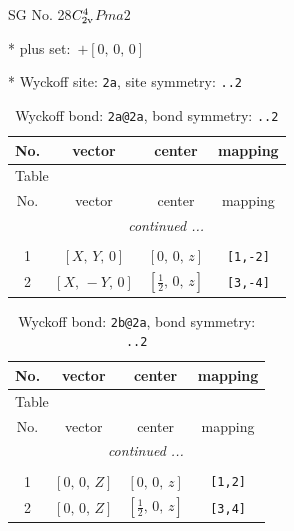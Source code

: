 \documentclass[fleqn,8pt]{jsarticle}
\begin{document}
\setcounter{MaxMatrixCols}{32}

\renewcommand{\tablename}{Table~}
\renewcommand{\figurename}{Figure~}
\begin{center}
\LARGE
SG No. 28\quad$C_{\rm 2v}^{4}$\quad$Pma2$\quad[ orthorhombic ]
\end{center}

* plus set:\,\,\,$+\left[ 0,\, 0,\, 0 \right]$


* Wyckoff site: {\tt 2a}, site symmetry: {\tt ..2}
\renewcommand{\arraystretch}{1.2}
\begin{longtable}{cccc}
\caption{Wyckoff bond: {\tt 2a@2a}, bond symmetry: {\tt ..2}}
 \\
 \hline \hline
No. & vector & center & mapping \\ \hline \endfirsthead

\multicolumn{3}{l}{\tablename\ \thetable{}} \\
 \hline \hline
No. & vector & center & mapping \\ \hline \endhead

 \hline \hline
\multicolumn{3}{r}{\footnotesize\it continued ...} \\ \endfoot

 \hline \hline
\multicolumn{3}{r}{} \\ \endlastfoot

1 & $\left[ X,\, Y,\, 0 \right]$ & $\left[ 0,\, 0,\, z \right]$ & {\tt [1,-2]} \\ \hline
2 & $\left[ X,\, - Y,\, 0 \right]$ & $\left[ \frac{1}{2},\, 0,\, z \right]$ & {\tt [3,-4]} \\
\end{longtable}
\renewcommand{\arraystretch}{1.2}
\begin{longtable}{cccc}
\caption{Wyckoff bond: {\tt 2b@2a}, bond symmetry: {\tt ..2}}
 \\
 \hline \hline
No. & vector & center & mapping \\ \hline \endfirsthead

\multicolumn{3}{l}{\tablename\ \thetable{}} \\
 \hline \hline
No. & vector & center & mapping \\ \hline \endhead

 \hline \hline
\multicolumn{3}{r}{\footnotesize\it continued ...} \\ \endfoot

 \hline \hline
\multicolumn{3}{r}{} \\ \endlastfoot

1 & $\left[ 0,\, 0,\, Z \right]$ & $\left[ 0,\, 0,\, z \right]$ & {\tt [1,2]} \\ \hline
2 & $\left[ 0,\, 0,\, Z \right]$ & $\left[ \frac{1}{2},\, 0,\, z \right]$ & {\tt [3,4]} \\
\end{longtable}
\end{document}
